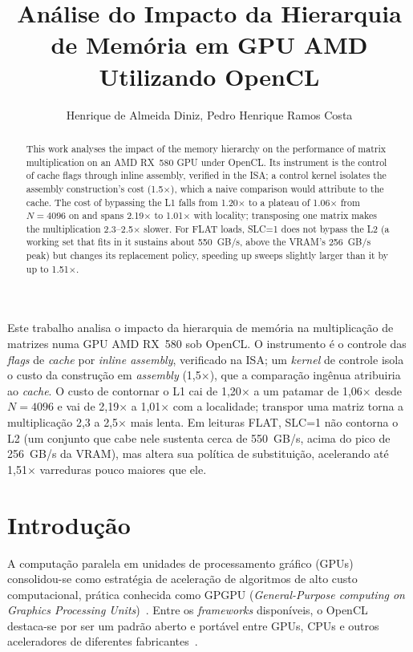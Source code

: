 \documentclass[12pt]{article}
\title{Análise do Impacto da Hierarquia de Memória em GPU AMD Utilizando OpenCL}
\author{Henrique de Almeida Diniz\inst{1}, Pedro Henrique Ramos Costa\inst{1}}
\begin{document}
\maketitle

\begin{abstract}
This work analyses the impact of the memory hierarchy on the performance of
matrix multiplication on an AMD RX~580 GPU under OpenCL. Its instrument is the
control of cache flags through inline assembly, verified in the ISA; a control
kernel isolates the assembly construction's cost (1.5$\times$), which a
naive comparison would attribute to the cache. The cost of bypassing the L1
falls from 1.20$\times$ to a plateau of 1.06$\times$ from $N=4096$ on and spans
2.19$\times$ to 1.01$\times$ with locality; transposing one matrix makes the
multiplication 2.3--2.5$\times$ slower. For FLAT loads, SLC=1 does not bypass
the L2 (a working set that fits in it sustains about 550~GB/s, above the VRAM's
256~GB/s peak) but changes its replacement policy, speeding up sweeps slightly
larger than it by up to 1.51$\times$.
\end{abstract}

\begin{resumo}
Este trabalho analisa o impacto da hierarquia de memória na multiplicação de
matrizes numa GPU AMD RX~580 sob OpenCL. O instrumento é o
controle das \textit{flags} de \textit{cache} por \textit{inline assembly},
verificado na ISA; um \textit{kernel} de controle isola o custo da
construção em \textit{assembly} (1,5$\times$), que a comparação ingênua atribuiria
ao \textit{cache}. O custo de contornar o L1 cai de 1,20$\times$ a um patamar
de 1,06$\times$ desde $N=4096$ e vai de 2,19$\times$ a 1,01$\times$ com a
localidade; transpor uma matriz torna a multiplicação 2,3 a 2,5$\times$
mais lenta. Em leituras FLAT, SLC=1 não contorna o L2 (um conjunto que cabe nele
sustenta cerca de 550~GB/s, acima do pico de 256~GB/s da VRAM), mas altera sua
política de substituição, acelerando até 1,51$\times$ varreduras pouco
maiores que ele.
\end{resumo}

\section{Introdução}

A computação paralela em unidades de processamento gráfico (GPUs) consolidou-se como estratégia de aceleração de algoritmos de alto custo computacional, prática conhecida como GPGPU (\textit{General-Purpose computing on Graphics Processing Units})~\cite{owens2008}. Entre os \textit{frameworks} disponíveis, o OpenCL destaca-se por ser um padrão aberto e portável entre GPUs, CPUs e outros aceleradores de diferentes fabricantes~\cite{stone2010}.
\end{document}
